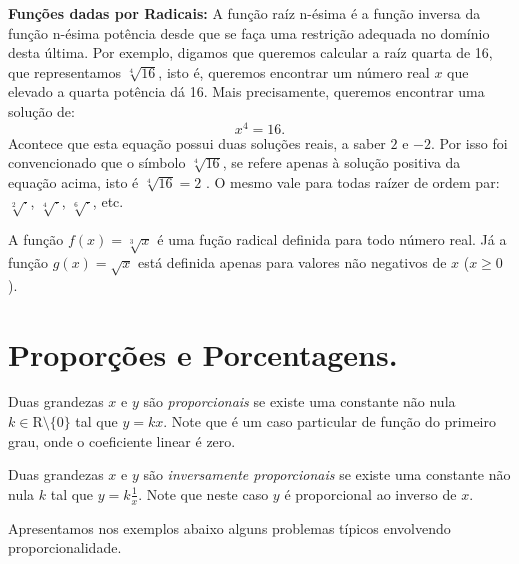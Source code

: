 \noindent\textbf{ Funções dadas por Radicais:}  A função raíz n-ésima é a função inversa da função n-ésima potência desde que
se faça  uma restrição adequada no domínio desta última. Por exemplo, digamos que queremos calcular a raíz quarta de
16, que representamos $\sqrt[4]{16}$, isto é, queremos encontrar um número real $x$ que elevado a quarta potência
dá 16. Mais precisamente, queremos encontrar uma solução de:
$$x^4=16.$$
Acontece que esta equação possui duas soluções reais, a saber $2$ e $-2$. Por isso foi convencionado que o símbolo
$\sqrt[4]{16}$, se refere apenas à solução positiva da equação acima, isto é $\sqrt[4]{16}=2$ .
O mesmo vale para todas raízer de ordem par: $\sqrt[2]{\cdot }$, $\sqrt[4]{\cdot}$, $\sqrt[6]{\cdot}$, etc.
\begin{center}
\begin{minipage}{16cm}
\end{minipage}
\end{center}
\begin{ex} A função $f(x)=\sqrt[3]{x}$ é uma fução radical definida para todo número real. Já a função $g(x)= \sqrt{x}$
está definida apenas para valores não negativos de $x$ ($x\geq 0$).
\end{ex}


\section{Proporções e Porcentagens.}

Duas grandezas $x$ e $y$ são \textit{proporcionais} se existe uma constante não nula $k\in \mbox{R}\setminus \{0\}$ tal que $y=kx$. Note que é um caso particular de função do primeiro grau, onde o coeficiente linear é zero.

Duas grandezas $x$ e $y$ são \textit{inversamente proporcionais} se existe uma constante não nula $k$ tal que $y=k\frac{1}{x}$. Note que neste caso $y$ é proporcional ao inverso de $x$.

Apresentamos nos exemplos abaixo alguns problemas típicos envolvendo proporcionalidade.

